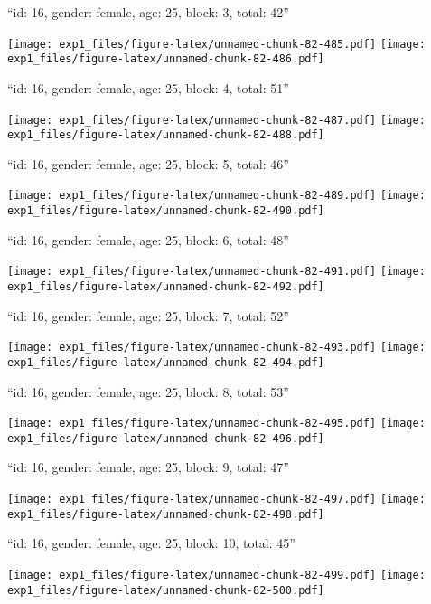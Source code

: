 \documentclass[11pt,,]{article}
\begin{document}
\newpage
[1] 

``id: 16, gender: female, age: 25, block: 3, total: 42''

\texttt{[image: exp1\_files/figure-latex/unnamed-chunk-82-485.pdf]}
\texttt{[image: exp1\_files/figure-latex/unnamed-chunk-82-486.pdf]}

\newpage
[1] 

``id: 16, gender: female, age: 25, block: 4, total: 51''

\texttt{[image: exp1\_files/figure-latex/unnamed-chunk-82-487.pdf]}
\texttt{[image: exp1\_files/figure-latex/unnamed-chunk-82-488.pdf]}

\newpage
[1] 

``id: 16, gender: female, age: 25, block: 5, total: 46''

\texttt{[image: exp1\_files/figure-latex/unnamed-chunk-82-489.pdf]}
\texttt{[image: exp1\_files/figure-latex/unnamed-chunk-82-490.pdf]}

\newpage
[1] 

``id: 16, gender: female, age: 25, block: 6, total: 48''

\texttt{[image: exp1\_files/figure-latex/unnamed-chunk-82-491.pdf]}
\texttt{[image: exp1\_files/figure-latex/unnamed-chunk-82-492.pdf]}

\newpage
[1] 

``id: 16, gender: female, age: 25, block: 7, total: 52''

\texttt{[image: exp1\_files/figure-latex/unnamed-chunk-82-493.pdf]}
\texttt{[image: exp1\_files/figure-latex/unnamed-chunk-82-494.pdf]}

\newpage
[1] 

``id: 16, gender: female, age: 25, block: 8, total: 53''

\texttt{[image: exp1\_files/figure-latex/unnamed-chunk-82-495.pdf]}
\texttt{[image: exp1\_files/figure-latex/unnamed-chunk-82-496.pdf]}

\newpage
[1] 

``id: 16, gender: female, age: 25, block: 9, total: 47''

\texttt{[image: exp1\_files/figure-latex/unnamed-chunk-82-497.pdf]}
\texttt{[image: exp1\_files/figure-latex/unnamed-chunk-82-498.pdf]}

\newpage
[1] 

``id: 16, gender: female, age: 25, block: 10, total: 45''

\texttt{[image: exp1\_files/figure-latex/unnamed-chunk-82-499.pdf]}
\texttt{[image: exp1\_files/figure-latex/unnamed-chunk-82-500.pdf]}
\end{document}
